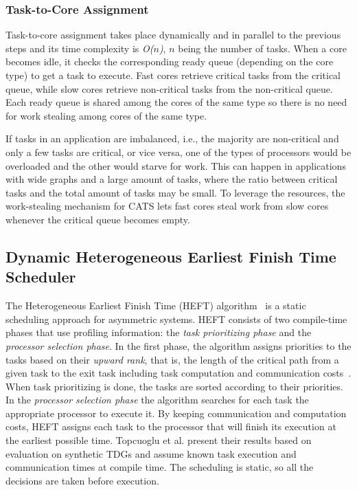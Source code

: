 \subsubsection{Task-to-Core Assignment}
\label{sec.cats.assignment}
Task-to-core assignment takes place dynamically and in parallel to the previous steps and its time complexity is \textit{O($n$)}, \textit{$n$} being the number of tasks. When a core becomes idle, it checks the corresponding ready queue (depending on the core type) to get a task to execute. Fast cores retrieve critical tasks from the critical queue, while slow cores retrieve non-critical tasks from the non-critical queue. Each ready queue is shared among the cores of the same type so there is no need for work stealing among cores of the same type. 

If tasks in an application are imbalanced, i.e., the majority are non-critical and only a few tasks are critical, or vice versa, one of the types of processors would be overloaded and the other would starve for work. This can happen in applications with wide graphs and a large amount of tasks, where the ratio between critical tasks and the total amount of tasks may be small. To leverage the resources, the work-stealing mechanism for CATS lets fast cores steal work from slow cores whenever the critical queue becomes empty. 




\subsection{Dynamic Heterogeneous Earliest Finish Time Scheduler}
The Heterogeneous Earliest Finish Time (HEFT) algorithm~\cite{HEFT} is a static scheduling approach for asymmetric systems.
HEFT consists of two compile-time phases that use profiling information: the \textit{task prioritizing phase} and the \textit{processor selection phase}.
In the first phase, the algorithm assigns priorities to the tasks based on their \textit{upward rank}, that is, the length of the critical path from a given task to the exit task including task computation and communication costs~\cite{HEFT}.
When task prioritizing is done, the tasks are sorted according to their priorities.
In the \textit{processor selection phase} the algorithm searches for each task the appropriate processor to execute it.
By keeping communication and computation costs, HEFT assigns each task to the processor that will finish its execution at the earliest possible time.
Topcuoglu et al. \cite{HEFT} present their results based on evaluation on synthetic TDGs and assume known task execution and communication times at compile time.
The scheduling is static, so all the decisions are taken before execution.

